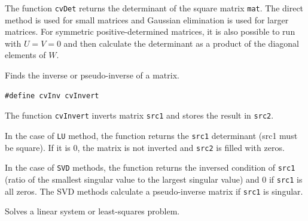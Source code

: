 The function \texttt{cvDet} returns the determinant of the square matrix \texttt{mat}. The direct method is used for small matrices and Gaussian elimination is used for larger matrices. For symmetric positive-determined matrices, it is also possible to run
with $U = V = 0$ and then calculate the determinant as a product of the diagonal elements of $W$.

\label{Invert}

Finds the inverse or pseudo-inverse of a matrix.

\begin{lstlisting}
#define cvInv cvInvert
\end{lstlisting}

\begin{description}
\end{description}

The function \texttt{cvInvert} inverts matrix \texttt{src1} and stores the result in \texttt{src2}.

In the case of \texttt{LU} method, the function returns the \texttt{src1} determinant (src1 must be square). If it is 0, the matrix is not inverted and \texttt{src2} is filled with zeros.

In the case of \texttt{SVD} methods, the function returns the inversed condition of \texttt{src1} (ratio of the smallest singular value to the largest singular value) and 0 if \texttt{src1} is all zeros. The SVD methods calculate a pseudo-inverse matrix if \texttt{src1} is singular.


\label{Solve}

Solves a linear system or least-squares problem.


